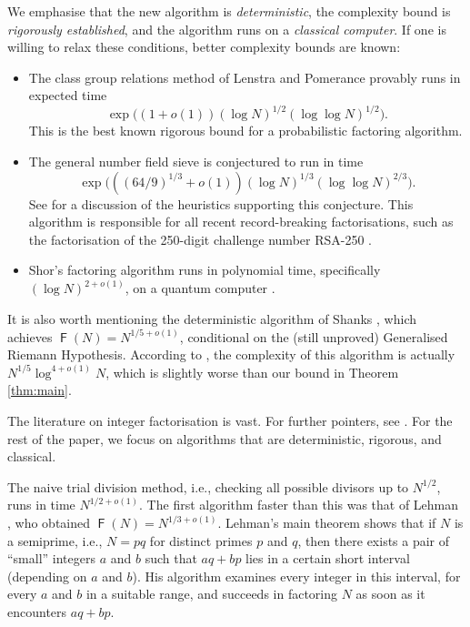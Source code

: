 \documentclass[reqno]{amsart}
\theoremstyle{remark}
\numberwithin{equation}{section}
\numberwithin{thm}{section}
\DeclareMathOperator{\FF}{\mathsf{F}}
\begin{document}
We emphasise that the new algorithm is \emph{deterministic},
the complexity bound is \emph{rigorously established},
and the algorithm runs on a \emph{classical computer}.
If one is willing to relax these conditions,
better complexity bounds are known:
\begin{itemize}[label=--,labelwidth=0.7cm,leftmargin=,itemsep=0.2em,topsep=\itemsep]
  \item
  The class group relations method of Lenstra and Pomerance \cite{LP-rigorous}
  provably runs in expected time
    \[ \exp\big((1 + o(1)) (\log N)^{1/2} (\log \log N)^{1/2}\big). \]
  This is the best known rigorous bound for a probabilistic factoring algorithm.
  
  \item
  The general number field sieve is conjectured to run in time
    \[ \exp\big(((64/9)^{1/3} + o(1)) (\log N)^{1/3} (\log \log N)^{2/3}\big). \]
  See \cite[\S6.2]{CP-primes} for a discussion of the heuristics
  supporting this conjecture.
  This algorithm is responsible for all recent record-breaking factorisations,
  such as the factorisation of the 250-digit challenge number RSA-250
  \cite{BGGHTZ-RSA250}.
  
  \item Shor's factoring algorithm runs in polynomial time,
  specifically $(\log N)^{2+o(1)}$, on a quantum computer
  \cite{Sho-factoring}.
\end{itemize}

It is also worth mentioning the deterministic algorithm of
Shanks \cite{Sha-classnumber},
which achieves $\FF(N) = N^{1/5+o(1)}$,
conditional on the (still unproved) Generalised Riemann Hypothesis.
According to \cite[\S5.6.4]{CP-primes},
the complexity of this algorithm is actually $N^{1/5} \log^{4+o(1)} N$,
which is slightly worse than our bound in Theorem \ref{thm:main}.
  
The literature on integer factorisation is vast.
For further pointers, see \cite{CP-primes}.
For the rest of the paper, we focus on algorithms that are
deterministic, rigorous, and classical.

The naive trial division method,
i.e., checking all possible divisors up to $N^{1/2}$,
runs in time $N^{1/2+o(1)}$.
The first algorithm faster than this was that of Lehman \cite{Leh-factoring},
who obtained $\FF(N) = N^{1/3+o(1)}$.
Lehman's main theorem shows that if $N$ is a semiprime,
i.e., $N = pq$ for distinct primes $p$ and $q$,
then there exists a pair of ``small'' integers $a$ and $b$ such that
$aq + bp$ lies in a certain short interval (depending on $a$ and $b$).
His algorithm examines every integer in this interval,
for every $a$ and $b$ in a suitable range,
and succeeds in factoring $N$ as soon as it encounters $aq + bp$.
\end{document}
